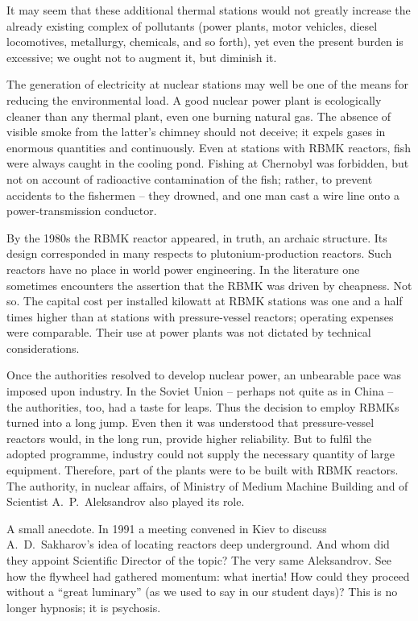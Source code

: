 \documentclass[openright]{bookest}
\begin{document}
It may seem that these additional thermal stations would not greatly increase the already existing complex of pollutants (power plants, motor vehicles, diesel locomotives, metallurgy, chemicals, and so forth), yet even the present burden is excessive; we ought not to augment it, but diminish it.

The generation of electricity at nuclear stations may well be one of the means for reducing the environmental load. A good nuclear power plant is ecologically cleaner than any thermal plant, even one burning natural gas. The absence of visible smoke from the latter's chimney should not deceive; it expels gases in enormous quantities and continuously. Even at stations with RBMK reactors, fish were always caught in the cooling pond. Fishing at Chernobyl was forbidden, but not on account of radioactive contamination of the fish; rather, to prevent accidents to the fishermen -- they drowned, and one man cast a wire line onto a power-transmission conductor.

By the 1980s the RBMK reactor appeared, in truth, an archaic structure. Its design corresponded in many respects to plutonium-production reactors. Such reactors have no place in world power engineering. In the literature one sometimes encounters the assertion that the RBMK was driven by cheapness. Not so. The capital cost per installed kilowatt at RBMK stations was one and a half times higher than at stations with pressure-vessel reactors; operating expenses were comparable. Their use at power plants was not dictated by technical considerations.

Once the authorities resolved to develop nuclear power, an unbearable pace was imposed upon industry. In the Soviet Union -- perhaps not quite as in China -- the authorities, too, had a taste for leaps. Thus the decision to employ RBMKs turned into a long jump. Even then it was understood that pressure-vessel reactors would, in the long run, provide higher reliability. But to fulfil the adopted programme, industry could not supply the necessary quantity of large equipment. Therefore, part of the plants were to be built with RBMK reactors. The authority, in nuclear affairs, of Ministry of Medium Machine Building and of Scientist A.~P.~Aleksandrov also played its role.

A small anecdote. In 1991 a meeting convened in Kiev to discuss A.~D.~Sakharov's idea of locating reactors deep underground. And whom did they appoint Scientific Director of the topic? The very same Aleksandrov. See how the flywheel had gathered momentum: what inertia! How could they proceed without a ``great luminary'' (as we used to say in our student days)? This is no longer hypnosis; it is psychosis.
\end{document}
